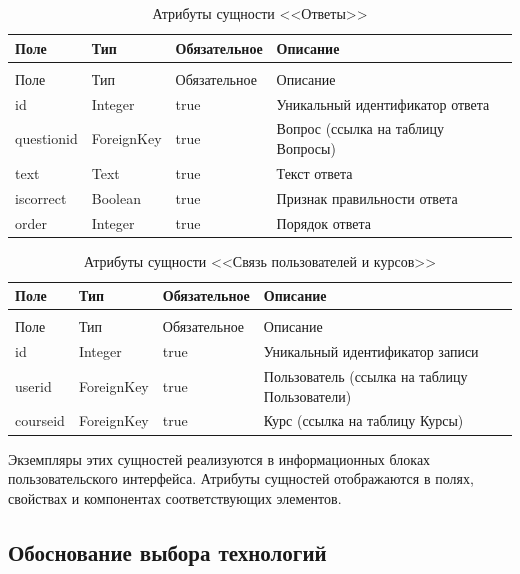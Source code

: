 \begin{xltabular}{\textwidth}{|l|l|p{3.2cm}|X|}
	\caption{Атрибуты сущности <<Ответы>>\label{answers:table}}\\ \hline
	Поле & Тип & Обязательное & Описание \\ \hline
	\endfirsthead
	\\ \hline
	Поле & Тип & Обязательное & Описание \\ \hline
	\endhead
	id & Integer & true & Уникальный идентификатор ответа \\ \hline
	questionid & ForeignKey & true & Вопрос (ссылка на таблицу Вопросы) \\ \hline
	text & Text & true & Текст ответа \\ \hline
	iscorrect & Boolean & true & Признак правильности ответа \\ \hline
	order & Integer & true & Порядок ответа \\ \hline
\end{xltabular}

\begin{xltabular}{\textwidth}{|l|l|p{3.2cm}|X|}
	\caption{Атрибуты сущности <<Связь пользователей и курсов>>\label{user_courses:table}}\\ \hline
	Поле & Тип & Обязательное & Описание \\ \hline
	\endfirsthead
	\\ \hline
	Поле & Тип & Обязательное & Описание \\ \hline
	\endhead
	id & Integer & true & Уникальный идентификатор записи \\ \hline
	userid & ForeignKey & true & Пользователь (ссылка на таблицу Пользователи) \\ \hline
	courseid & ForeignKey & true & Курс (ссылка на таблицу Курсы) \\ \hline
\end{xltabular}

Экземпляры этих сущностей реализуются в информационных блоках пользовательского интерфейса. Атрибуты сущностей отображаются в полях, свойствах и компонентах соответствующих элементов.

\subsection{Обоснование выбора технологий}

